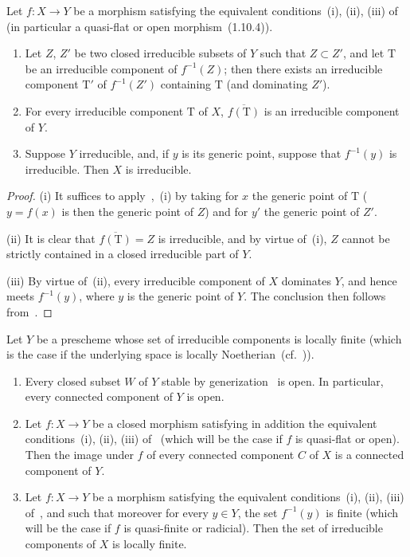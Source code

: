 \begin{corollary}[2.3.5]
\label{IV.2.3.5}
Let $f:X\to Y$ be a morphism satisfying the equivalent conditions~(i), (ii), (iii) of~ \textnormal{(}in particular a quasi-flat or open morphism~(1.10.4)\textnormal{)}.
\begin{enumerate}
  \item[(i)] Let $Z$, $Z'$ be two closed irreducible subsets of $Y$ such that $Z\subset Z'$, and let $\mathrm{T}$ be an irreducible component of $f^{-1}(Z)$; then there exists an irreducible component $\mathrm{T}'$ of $f^{-1}(Z')$ containing $\mathrm{T}$ \textnormal{(}and dominating $Z'$\textnormal{)}.
  \item[(ii)] For every irreducible component $\mathrm{T}$ of $X$, $\overline{f(\mathrm{T})}$ is an irreducible component of $Y$.
  \item[(iii)] Suppose $Y$ irreducible, and, if $y$ is its generic point, suppose that $f^{-1}(y)$ is irreducible. Then $X$ is irreducible.
\end{enumerate}
\end{corollary}

\begin{proof}
(i) It suffices to apply~,~(i) by taking for $x$ the generic point of $\mathrm{T}$ ($y=f(x)$ is then the generic point of $Z$) and for $y'$ the generic point of $Z'$.

(ii) It is clear that $\overline{f(\mathrm{T})}=Z$ is irreducible, and by virtue of~(i), $Z$ cannot be strictly contained in a closed irreducible part of $Y$.

(iii) By virtue of~(ii), every irreducible component of $X$ dominates $Y$, and hence meets $f^{-1}(y)$, where $y$ is the generic point of $Y$.
The conclusion then follows from~.
\end{proof}

\begin{proposition}[2.3.6]
\label{IV.2.3.6}
Let $Y$ be a prescheme whose set of irreducible components is locally finite \textnormal{(}which is the case if the underlying space is locally Noetherian~(cf.~)\textnormal{)}.
\begin{enumerate}
  \item[(i)] Every closed subset $W$ of $Y$ stable by generization~ is open. In particular, every connected component of $Y$ is open.
  \item[(ii)] Let $f:X\to Y$ be a closed morphism satisfying in addition the equivalent conditions~(i), (ii), (iii) of~ \textnormal{(}which will be the case if $f$ is quasi-flat or open\textnormal{)}. Then the image under $f$ of every connected component $C$ of $X$ is a connected component of $Y$.
  \item[(iii)] Let $f:X\to Y$ be a morphism satisfying the equivalent conditions~(i), (ii), (iii) of~, and such that moreover for every $y\in Y$, the set $f^{-1}(y)$ is finite \textnormal{(}which will be the case if $f$ is quasi-finite or radicial\textnormal{)}. Then the set of irreducible components of $X$ is locally finite.
\end{enumerate}
\end{proposition}

